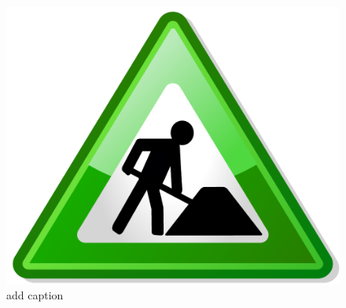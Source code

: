 \begin{figure}[t]

\centering
\includegraphics[width=0.95\columnwidth]{figs/tocome}
\caption{add caption}
\label{fig:tocome2}

\end{figure}


